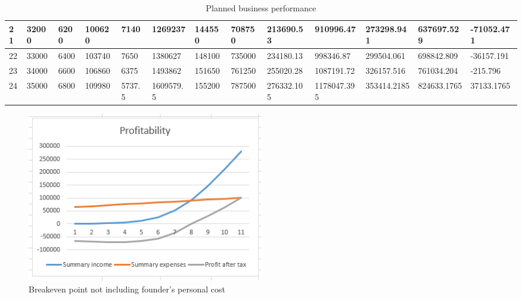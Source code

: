 \begin{table}[]
{\begin{tabular}{|l|l|l|l|l|l|l|l|l|l|l|l|l|}
        21    & 32000     & 6200          & 100620                                                & 7140                                                           & 1269237                                                  & 144550                                                     & 708750                                                          & 213690.53  & 910996.47   & 273298.941    & 637697.529       & -71052.471      \\ \hline
        22    & 33000     & 6400          & 103740                                                & 7650                                                           & 1380627                                                  & 148100                                                     & 735000                                                          & 234180.13  & 998346.87   & 299504.061    & 698842.809       & -36157.191      \\ \hline
        23    & 34000     & 6600          & 106860                                                & 6375                                                           & 1493862                                                  & 151650                                                     & 761250                                                          & 255020.28  & 1087191.72  & 326157.516    & 761034.204       & -215.796        \\ \hline
        24    & 35000     & 6800          & 109980                                                & 5737.5                                                         & 1609579.5                                                & 155200                                                     & 787500                                                          & 276332.105 & 1178047.395 & 353414.2185   & 824633.1765      & 37133.1765      \\ \hline
        \end{tabular}}
    \caption{Planned business performance}
    \label{fig:budget}
\end{table}

\begin{figure}[H]
    \centering
    \includegraphics[width=0.5\textwidth]{figures/breakeven_no_salary.png}
    \caption{Breakeven point not including founder's personal cost}
    \label{fig:breakeven_no_salary}
\end{figure}

